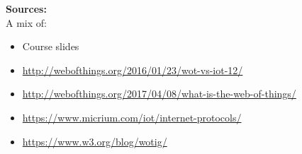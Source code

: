\textbf{Sources:}\\

A mix of:

\begin{itemize}
  \item Course slides
  \item \url{http://webofthings.org/2016/01/23/wot-vs-iot-12/}
  \item \url{http://webofthings.org/2017/04/08/what-is-the-web-of-things/}
  \item \url{https://www.micrium.com/iot/internet-protocols/}
  \item \url{https://www.w3.org/blog/wotig/}
\end{itemize}

